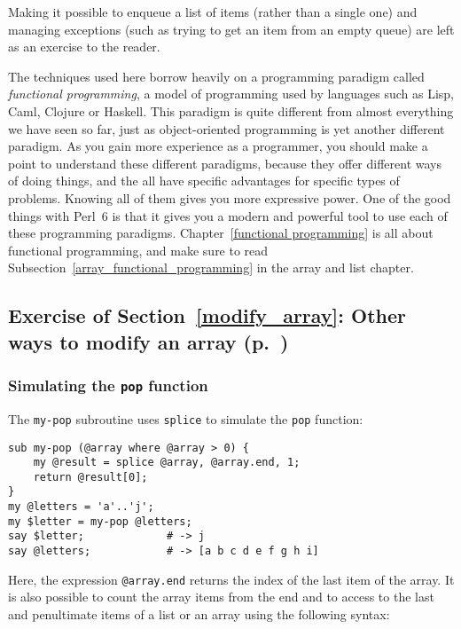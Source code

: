 Making it possible to enqueue a list of items (rather 
than a single one) and managing exceptions (such as 
trying to get an item from an empty queue) are left 
as an exercise to the reader.

The techniques used here borrow heavily on a programming 
paradigm called \emph{functional programming}, a model of 
programming used by languages such as Lisp, Caml, Clojure or 
Haskell. This paradigm is quite different from almost 
everything we have seen so far, just as object-oriented 
programming is yet another different paradigm. As you gain 
more experience as a programmer, you should make a point 
to understand these different paradigms, because they offer 
different ways of doing things, and the all have specific 
advantages for specific types of problems. Knowing all of them 
gives you more expressive power. One of the good things with 
Perl~6 is that it gives you a modern and powerful tool to use 
each of these programming paradigms. 
Chapter~\ref{functional programming} is all about functional 
programming, and make sure to read 
Subsection~\ref{array_functional_programming} in the 
array and list chapter.

\subsection{Exercise of Section~\ref{modify_array}: Other ways to modify an array (p.~\pageref{splice_exercise})}
\label{sol_splice_exercise}

\subsubsection{Simulating the {\tt pop} function}

The {\tt my-pop} subroutine uses {\tt splice} to simulate 
the {\tt pop} function: 

\begin{verbatim}
sub my-pop (@array where @array > 0) {
    my @result = splice @array, @array.end, 1;
    return @result[0];
}
my @letters = 'a'..'j';
my $letter = my-pop @letters;
say $letter;             # -> j
say @letters;            # -> [a b c d e f g h i]
\end{verbatim}

Here, the expression \verb'@array.end' returns the index of 
the last item of the array. It is also possible to count 
the array items from the end and to access to the last and 
penultimate items of a list or an array using the following 
syntax:

